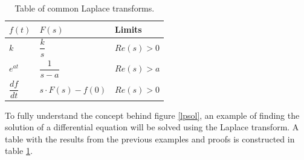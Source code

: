 \begin{table}[H]
\center
\begin{tabular}{lll}
\hline
\multicolumn{1}{|l|}{$f(t)$}           & \multicolumn{1}{l|}{$F(s)$}                & \multicolumn{1}{l|}{Limits}    \\ \hline
\multicolumn{1}{|l|}{$k$}              & \multicolumn{1}{l|}{$\dfrac{k}{s}$}        & \multicolumn{1}{l|}{$Re(s)>0$} \\ \hline
\multicolumn{1}{|l|}{$e^{at}$}         & \multicolumn{1}{l|}{$\dfrac{1}{s-a}$}      & \multicolumn{1}{l|}{$Re(s)>a$} \\ \hline
\multicolumn{1}{|l|}{$\dfrac{df}{dt}$} & \multicolumn{1}{l|}{$s \cdot F(s) - f(0)$} & \multicolumn{1}{l|}{$Re(s)>0$} \\ \hline                          
\end{tabular}
\caption{Table of common Laplace transforms.}
\label{lptable}
\end{table}
\noindent To fully understand the concept behind figure \ref{lpsol}, an example of finding the solution of a differential equation will be solved using the Laplace transform. A table with the results from the previous examples and proofs is constructed in table \ref{lptable}.
\\

